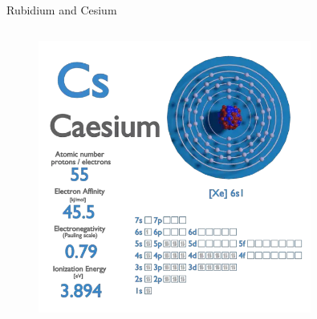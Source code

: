 \begin{frame}{Rubidium and Cesium}
\begin{columns}[c, onlytextwidth]
\begin{column}{0.5\textwidth}
            \begin{figure}
                \centering
                \includegraphics[width=0.8\textwidth]{img/data-Caesium.png}
            \end{figure}

        \end{column}

    \end{columns}

\end{frame}



